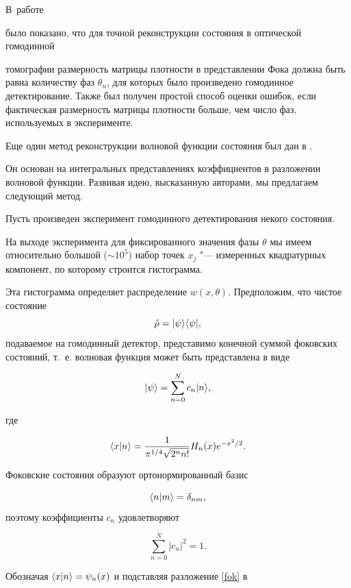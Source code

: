 В~работе \cite{leonhardt1}

было показано, что для точной реконструкции состояния в оптической гомодинной

 томографии размерность матрицы плотности в представлении Фока должна быть равна количеству фаз $\theta_n$, для которых было произведено гомодинное детектирование. Также был получен простой способ оценки ошибок, если фактическая размерность матрицы плотности больше, чем число фаз, используемых в эксперименте.



Еще один метод реконструкции волновой функции состояния был дан в \cite{orlow}.

 Он основан на интегральных представлениях коэффициентов в разложении волновой функции. Развивая идею, высказанную авторами, мы предлагаем следующий метод.



Пусть произведен эксперимент гомодинного детектирования некого состояния. 

На выходе эксперимента для фиксированного значения фазы $\theta$ мы имеем относительно большой ($\sim 10^5$) набор точек $x_j$ "--- измеренных квадратурных компонент, по которому строится гистограмма. 

Эта гистограмма определяет распределение $w(x,\theta)$. Предположим, что чистое состояние $$\hat\rho=\lvert{\psi}\rangle\langle{\psi}\rvert,$$ подаваемое на гомодинный детектор, представимо конечной суммой фоковских состояний, т.~е. волновая функция может быть представлена в виде

\begin{equation}\label{fok}

\ket{\psi}=\sum\limits_{n=0}^{N}c_n\ket{n},

\end{equation}

где

\begin{equation}\label{dva1}

\langle x\ket{n}=\frac{1}{\pi^{1/4}\sqrt{2^n n!}}H_n(x)e^{-x^2/2}.

\end{equation}

Фоковские состояния образуют ортонормированный базис

$$\langle{n}\lvert{m}\rangle=\delta_{nm},$$ поэтому коэффициенты $c_n$ удовлетворяют

$$\sum_{n=0}^{N}|c_n|^2=1.$$

Обозначая $\langle x\lvert{n}\rangle=\psi_n(x)$ и подставляя разложение \eqref{fok} в 

